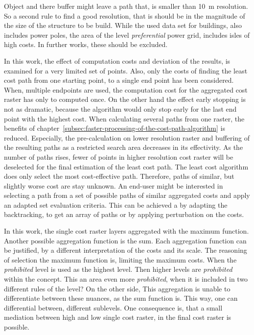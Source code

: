 Object and there buffer might leave a  path that, is smaller than 10~m resolution.
So a second rule to find a good resolution, that is should be in the magnitude of the size of the structure  to be build.
While the used data set for buildings, also includes power poles, the area of the level \textit{preferential} power grid, includes isles of high costs. 
In further works, these should be excluded.

In this work, the effect of computation costs and deviation of the results, is examined for a very limited set of points.
Also, only the costs of finding the least cost path from one starting point, to a single end point has been considered.
When, multiple endpoints are used, the computation cost for the aggregated cost raster has only to computed once.
On the other hand the effect early stopping is not as dramatic, because the algorithm would only stop early for the last end point with the highest cost.
When calculating several paths from one raster, the benefits of chapter~\ref{subsec:faster-processing-of-the-cost-path-algorithm} is reduced.
Especially, the pre-calculation on lower resolution raster and buffering of the resulting paths as a restricted search area decreases in its effectivity.
As the number of paths rises, fewer of points in higher resolution cost raster will be deselected for the final estimation of the least cost path.
The least cost algorithm does only select the most cost-effective path.
Therefore, paths of similar, but slightly worse cost are stay unknown.
An end-user might be interested in selecting a path from a set of possible paths of similar aggregated costs and apply an adapted set evaluation criteria.
This can be achieved a by adapting the backtracking, to get an array of paths or by applying perturbation on the costs.

In this work, the single cost raster layers aggregated with the maximum function. 
Another possible aggregation function is the sum.
Each aggregation function can be justified, by a different interpretation of the costs and its scale.
The reasoning of selection the maximum function is, limiting the maximum costs.
When the \textit{prohibited} level is used as the highest level.
Then higher levels are \textit{prohibited} within the concept.
This an area even more \textit{prohibited}, when it is included in two different rules of the level?
On the other side, This aggregation is unable to differentiate between these nuances, as  the sum function is.
This way, one can differential between, different sublevels.
One consequence is, that a small mediation between high and low single cost raster, in the final cost raster is possible.

